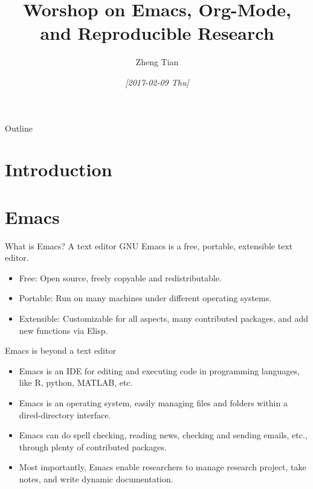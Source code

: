 \documentclass[presentation]{beamer}
\author{Zheng Tian}
\date{\textit{[2017-02-09 Thu]}}
\title{Worshop on Emacs, Org-Mode, and Reproducible Research}
\begin{document}
\maketitle
\begin{frame}{Outline}
\setcounter{tocdepth}{1}
\tableofcontents
\end{frame}



\section*{Introduction}
\label{sec:org1529094}

\section*{Emacs}
\label{sec:orgf8ae889}

\begin{frame}[label={sec:orga3db2e1}]{What is Emacs? A text editor}
GNU Emacs is a free, portable, extensible text editor.

\begin{itemize}
\item Free: Open source, freely copyable and redistributable.
\item Portable: Run on many machines under different operating systems.
\item Extensible: Customizable for all aspects, many contributed packages,
and add new functions via Elisp.
\end{itemize}
\end{frame}

\begin{frame}[label={sec:orgf6c6fa5}]{Emacs is beyond a text editor}
\begin{itemize}
\item Emacs is an IDE for editing and executing code in programming
languages, like R, python, MATLAB, etc.
\item Emacs is an operating system, easily managing files and folders
within a dired-directory interface.
\item Emacs can do spell checking, reading news, checking and sending
emails, etc., through plenty of contributed packages.
\item Most importantly, Emacs enable researchers to manage research
project, take notes, and write dynamic documentation.
\end{itemize}
\end{frame}
\end{document}
